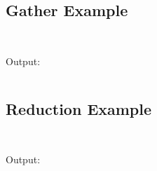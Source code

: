 \begin{verbatim}

\end{verbatim}

\subsection {Gather Example}
\begin{verbatim}


\end{verbatim}

Output:

\begin{verbatim}

\end{verbatim}

\subsection {Reduction Example}
\begin{verbatim}


\end{verbatim}

Output:

\begin{verbatim}

\end{verbatim}
